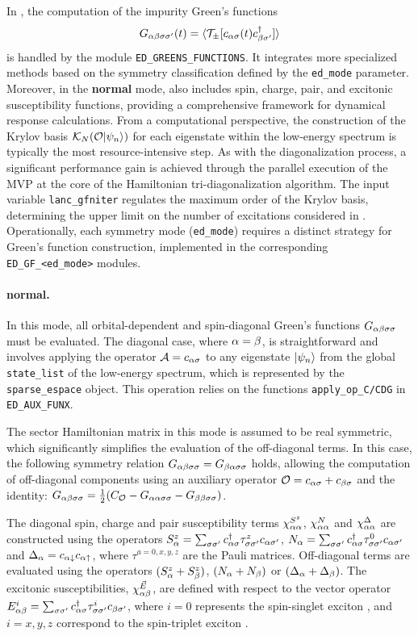 \documentclass[edipack_sp.tex]{subfiles}
\begin{document}
In \NAME, the computation of the impurity Green's functions 
$$
G_{\alpha\beta\sigma\sigma'}(t)=\langle {\cal T}_\pm[ c_{\alpha\sigma}(t) c_{\beta\sigma'}^\dagger ]\rangle
$$
is handled by the module \texttt{ED\_GREENS\_FUNCTIONS}.
It integrates more specialized methods based on the symmetry
classification defined by the \texttt{ed\_mode} parameter.
Moreover, in the {\bf normal} mode, \NAME also includes spin, charge, pair, and excitonic susceptibility functions, providing a comprehensive framework for dynamical response calculations.
From a computational perspective, the construction of the Krylov basis
$\mathcal{K}_N({\cal O}|\psi_n\rangle)$ for each eigenstate within the low-energy
spectrum is typically the most resource-intensive step.
As with the
diagonalization process, a significant performance gain is achieved through
the parallel execution of the MVP at the core of
the Hamiltonian tri-diagonalization algorithm.
The input variable
\texttt{lanc\_gfniter} regulates the maximum order of the Krylov basis,
determining the upper limit on the number of excitations considered in
.
Operationally, each symmetry mode (\texttt{ed\_mode}) requires a distinct
strategy for Green's function construction, implemented in the corresponding
\texttt{ED\_GF\_<ed\_mode>} modules.


\paragraph{{\bf normal}.}
In this mode, all orbital-dependent and spin-diagonal Green's 
functions $G_{\alpha\beta\sigma\sigma}$ must be evaluated. The diagonal 
case, where $\alpha=\beta$, is straightforward and involves applying 
the operator ${\cal A}=c_{\alpha\sigma}$ to any eigenstate $|\psi_n\rangle$ 
from the global {\tt state\_list} of the low-energy spectrum, 
which is represented by the {\tt sparse\_espace} object. This 
operation relies on the functions {\tt apply\_op\_C/CDG} in 
{\tt ED\_AUX\_FUNX}. 



The sector Hamiltonian matrix in this mode is assumed 
to be real symmetric, which significantly simplifies the evaluation of the off-diagonal terms. In this case, the following symmetry relation 
$G_{\alpha\beta\sigma\sigma}=G_{\beta\alpha\sigma\sigma}$ holds, allowing the computation of 
off-diagonal components using an auxiliary operator 
${\cal O}=c_{\alpha\sigma}+c_{\beta\sigma}$ and the identity:
$G_{\alpha\beta\sigma\sigma}=\tfrac{1}{2}(C_{\cal O} - G_{\alpha\alpha\sigma\sigma} - G_{\beta\beta\sigma\sigma})$.

The diagonal spin, charge and pair susceptibility terms
$\chi^{S^z}_{\alpha\alpha}$, $\chi^N_{\alpha\alpha}$ and $\chi^\Delta_{\alpha\alpha}$
are constructed using the operators $S^z_\alpha = \sum_{\sigma\sigma'} c^\dagger_{\alpha\sigma}
\tau^z_{\sigma\sigma'} c_{\alpha\sigma'}$, 
$N_\alpha = \sum_{\sigma\sigma'} c^\dagger_{\alpha\sigma} \tau^0_{\sigma\sigma'} c_{\alpha\sigma'}$
and $\Delta_\alpha = c_{\alpha\downarrow}c_{\alpha\uparrow}$,
where $\tau^{a=0,x,y,z}$ are the Pauli matrices.
Off-diagonal terms are  evaluated using the operators
$(S^z_\alpha + S^z_\beta)$, $(N_\alpha + N_\beta)$ or $(\Delta_\alpha + \Delta_\beta)$. 
The excitonic susceptibilities, $\chi^{\vec{E}}_{\alpha\beta}$, are defined with 
respect to the vector operator $E^i_{\alpha\beta} = \sum_{\sigma\sigma'}
c^\dagger_{\alpha\sigma}\tau^i_{\sigma\sigma'}c_{\beta\sigma'}$, where $i=0$ represents the
spin-singlet exciton \cite{Giuli2023PRB}, and $i=x,y,z$  correspond to the spin-triplet exciton \cite{Amaricci2023PRB}.
\end{document}
